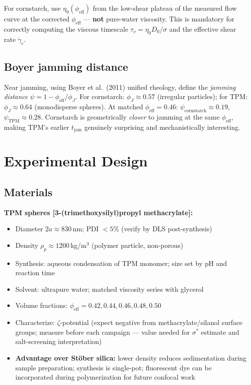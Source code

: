 \documentclass[11pt,letterpaper]{article}
\newcommand{\phieff}{\phi_{\mathrm{eff}}}
\newcommand{\phiJ}{\phi_{J}}
\newcommand{\tjam}{t_{\mathrm{jam}}}
\newcommand{\gamcrit}{\dot{\gamma}_c}
\newcommand{\sigstar}{\sigma^*}
\begin{document}
For cornstarch, use $\eta_0(\phieff)$ from the low-shear plateau of the
measured flow curve at the corrected $\phieff$ --- \textbf{not} pure-water
viscosity. This is mandatory for correctly computing the viscous timescale
$\tau_v = \eta_0 D_0 / \sigma$ and the effective shear rate $\gamcrit$.

\subsection{Boyer jamming distance}

Near jamming, using Boyer et al.\ (2011) \cite{Boyer2011} unified rheology,
define the \emph{jamming distance} $\psi = 1 - \phieff/\phiJ$.
For cornstarch: $\phiJ \approx 0.57$ (irregular particles);
for TPM: $\phiJ \approx 0.64$ (monodisperse spheres). At matched $\phieff = 0.46$:
$\psi_\mathrm{cornstarch} \approx 0.19$, $\psi_\mathrm{TPM} \approx 0.28$.
Cornstarch is geometrically \emph{closer} to jamming at the same $\phieff$,
making TPM's earlier $\tjam$ genuinely surprising and mechanistically
interesting.

\section{Experimental Design}

\subsection{Materials}

\noindent\textbf{TPM spheres [3-(trimethoxysilyl)propyl methacrylate]:}
\begin{itemize}[noitemsep,topsep=3pt]
  \item Diameter $2a \approx 830$\,nm; PDI $< 5\%$ (verify by DLS post-synthesis)
  \item Density $\rho_p \approx 1200$\,kg/m$^3$ (polymer particle, non-porous)
  \item Synthesis: aqueous condensation of TPM monomer; size set by pH and reaction
    time \cite{Sacanna2013}
  \item Solvent: ultrapure water; matched viscosity series with glycerol
  \item Volume fractions: $\phieff = 0.42, 0.44, 0.46, 0.48, 0.50$
  \item Characterize: $\zeta$-potential (expect negative from methacrylate/silanol
    surface groups; measure before each campaign --- value needed for $\sigstar$
    estimate and salt-screening interpretation)
  \item \textbf{Advantage over Stöber silica:} lower density reduces sedimentation
    during sample preparation; synthesis is single-pot; fluorescent dye can be
    incorporated during polymerization for future confocal work
\end{itemize}
\end{document}
